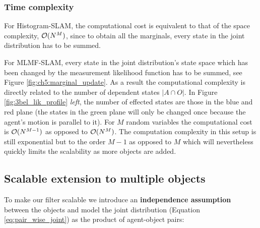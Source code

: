 \subsubsection{Time complexity}

For Histogram-SLAM, the computational cost is equivalent to that of the space complexity, $\operatorname{\mathcal{O}}(N^M)$,
since to obtain all the marginals, every state in the joint distribution has to be summed.

For MLMF-SLAM, every state in the joint distribution's state space which has been changed by the measurement likelihood function 
has to be summed, see Figure \ref{fig:ch5:marginal_update}. As a result the computational complexity is directly related to the number 
of dependent states $|A \cap O|$. In Figure \ref{fig:3bel_lik_profile} \textit{left}, the number of effected states are those in the blue
and red plane (the states in the green plane will only be changed once because the agent's motion is parallel to it).
For $M$ random variables the computational cost is $\operatorname{\mathcal{O}}(N^{M-1})$ as opposed to $\operatorname{\mathcal{O}}(N^M)$. 
The computation complexity in this setup is still exponential but to the order $M-1$ as opposed to $M$ which will nevertheless quickly limits 
the scalability as more objects are added. 


\subsection{Scalable extension to multiple objects}\label{subsec:scalabe_extension}

To make our filter scalable we introduce an \textbf{independence assumption} between the objects and model the joint distribution (Equation \ref{eq:pair_wise_joint}) as the product 
of agent-object pairs:

